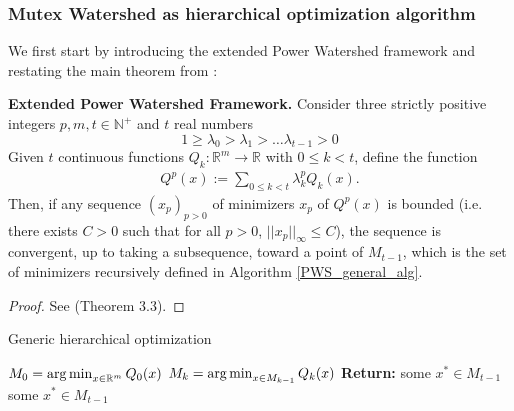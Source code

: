 \subsubsection{Mutex Watershed as hierarchical optimization algorithm}
We first start by introducing the extended Power Watershed framework and restating the main theorem from \cite{najman2017extending}: 
\begin{theorem} \label{theorem:PW_framework}
\textbf{\cite{najman2017extending} Extended Power Watershed Framework.}
Consider three strictly positive integers $p,m,t\in \mathbb{N}^+$ and $t$ real numbers 
\begin{equation}
    1 \geq \lambda_0 > \lambda_1 > \ldots \lambda_{t-1}>0 \label{eq:sorted lambda}
\end{equation}
Given $t$ continuous functions $Q_k: \mathbb{R}^m \rightarrow \mathbb{R}$ with $0\leq k < t$, define the function
\begin{align}
Q^p(x) := \sum_{0\leq k< t} \lambda^p_k Q_k (x). \label{eq:def_Q_p}
\end{align}
Then, if any sequence $(x_p)_{p>0}$ of minimizers $x_p$ of $Q^p(x)$ is bounded (i.e. there exists $C>0$ such that for all $p>0$, $||x_p||_{\infty}\leq C$), the sequence is convergent, up to taking a subsequence, toward a point of $M_{t-1}$, which is the set of minimizers recursively defined in Algorithm \ref{PWS_general_alg}.
\end{theorem}
\begin{proof}
See \cite{najman2017extending} (Theorem 3.3).
\end{proof}


\begin{algorithm}[t]
  \caption{Generic hierarchical optimization}
  \begin{algorithmic}[1]
           \State $M_0 = \operatorname*{arg\,min}_{x \in \mathbb{R}^m} Q_0(x)$
              \State $M_k = \operatorname*{arg\,min}_{x \in M_{k-1}} Q_k(x)$
            \EndFor
           \textbf{Return: } some $x^* \in M_{t-1}$
      \State
      \Return some $x^* \in M_{t-1}$
        \EndProcedure
  \end{algorithmic}
    \label{PWS_general_alg}

\end{algorithm}

